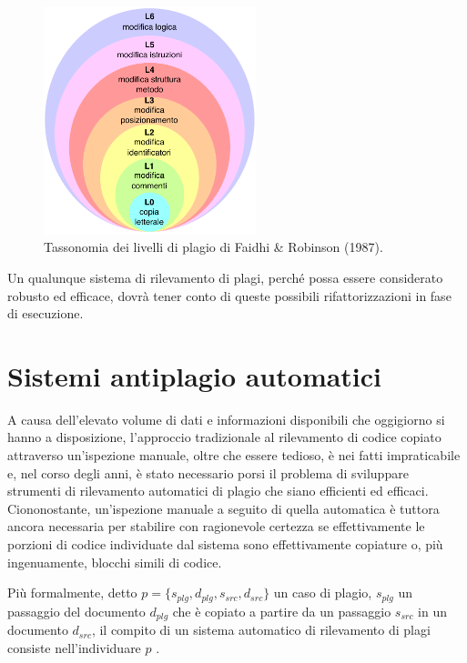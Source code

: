 \begin{figure}[h]
    \centering
    \includegraphics[width=0.55\textwidth]{resources/img/01-levels-of-plagiarism.pdf}
    \caption{Tassonomia dei livelli di plagio di Faidhi \& Robinson (1987).}
    \label{img:01-levels-of-plagiarism}
\end{figure}

Un qualunque sistema di rilevamento di plagi, perché possa essere considerato robusto ed efficace, dovrà tener conto di queste possibili rifattorizzazioni in fase di esecuzione.

\section{Sistemi antiplagio automatici}
A causa dell'elevato volume di dati e informazioni disponibili che oggigiorno si hanno a disposizione, l'approccio tradizionale al rilevamento di codice copiato attraverso un'ispezione manuale, oltre che essere tedioso, è nei fatti impraticabile e, nel corso degli anni, è stato necessario porsi il problema di sviluppare strumenti di rilevamento automatici di plagio che siano efficienti ed efficaci.
%
Ciononostante, un'ispezione manuale a seguito di quella automatica è tuttora ancora necessaria per stabilire con ragionevole certezza se effettivamente le porzioni di codice individuate dal sistema sono effettivamente copiature o, più ingenuamente, blocchi simili di codice.

Più formalmente, detto $p = \{s_{plg}, d_{plg}, s_{src}, d_{src}\}$ un caso di plagio, $s_{plg}$ un passaggio del documento $d_{plg}$ che è copiato a partire da un passaggio $s_{src}$ in un documento $d_{src}$, il compito di un sistema automatico di rilevamento di plagi consiste nell'individuare $p$ \cite{yalcin-et-al-2022}.

